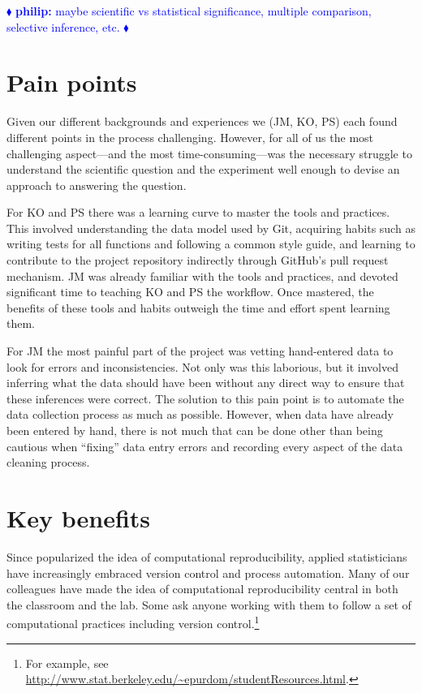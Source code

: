 \documentclass[]{article}
\newcommand{\philip}[1] { \textcolor{blue} {
\ensuremath{\blacklozenge} {\bf philip:}  {#1}
\ensuremath{\blacklozenge} } }
\begin{document}
\philip{
maybe scientific vs statistical significance, multiple comparison, selective
inference, etc.
}

\section{Pain points}\label{pain-points}

Given our different backgrounds and experiences we (JM, KO, PS) each found
different points in the process challenging. 
However, for all of us the most challenging aspect---and the most 
time-consuming---was the necessary
struggle to understand the scientific question and the experiment
well enough to devise an approach to answering the question.

For KO and PS there was a learning curve to master the tools and practices.
This involved understanding the data model used by Git, acquiring habits such
as writing tests for all functions and following a common style guide, and
learning to contribute to the project repository indirectly through GitHub's
pull request mechanism.
JM was already familiar with the tools and practices, and devoted significant time
to teaching KO and PS the workflow.
Once mastered, the benefits of these tools and habits outweigh the time and effort
spent learning them.

For JM the most painful part of the project was vetting hand-entered data
to look for errors and inconsistencies.
Not only was this laborious, but it involved inferring what the data
should have been without any direct way to ensure that these inferences were
correct.
The solution to this pain point is to automate the data collection process as
much as possible.
However, when data have already been entered by hand, there is not much that can
be done other than being cautious when ``fixing'' data entry errors and recording
every aspect of the data cleaning process.

\section{Key benefits}\label{key-benefits}

Since \citet{buckheit1995wavelab} popularized the idea of computational
reproducibility, applied statisticians have increasingly embraced version control
and process automation.
Many of our colleagues have made the idea of computational reproducibility
central in both the classroom and the lab.
Some ask anyone working with them to follow a set of computational practices
including version control.\footnote{
  For example, see
  \url{http://www.stat.berkeley.edu/~epurdom/studentResources.html}.
}
\end{document}
